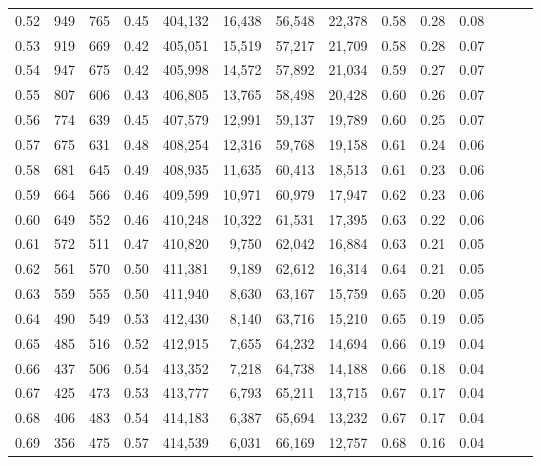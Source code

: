 \begin{tabular}{rrrrrrrrrrrrrr}
0.52 &     949 &    765 &  0.45 &  404,132 &   16,438 &  56,548 &  22,378 &  0.58 &  0.28 &      0.08 \\
0.53 &     919 &    669 &  0.42 &  405,051 &   15,519 &  57,217 &  21,709 &  0.58 &  0.28 &      0.07 \\
0.54 &     947 &    675 &  0.42 &  405,998 &   14,572 &  57,892 &  21,034 &  0.59 &  0.27 &      0.07 \\
0.55 &     807 &    606 &  0.43 &  406,805 &   13,765 &  58,498 &  20,428 &  0.60 &  0.26 &      0.07 \\
0.56 &     774 &    639 &  0.45 &  407,579 &   12,991 &  59,137 &  19,789 &  0.60 &  0.25 &      0.07 \\
0.57 &     675 &    631 &  0.48 &  408,254 &   12,316 &  59,768 &  19,158 &  0.61 &  0.24 &      0.06 \\
0.58 &     681 &    645 &  0.49 &  408,935 &   11,635 &  60,413 &  18,513 &  0.61 &  0.23 &      0.06 \\
0.59 &     664 &    566 &  0.46 &  409,599 &   10,971 &  60,979 &  17,947 &  0.62 &  0.23 &      0.06 \\
0.60 &     649 &    552 &  0.46 &  410,248 &   10,322 &  61,531 &  17,395 &  0.63 &  0.22 &      0.06 \\
0.61 &     572 &    511 &  0.47 &  410,820 &    9,750 &  62,042 &  16,884 &  0.63 &  0.21 &      0.05 \\
0.62 &     561 &    570 &  0.50 &  411,381 &    9,189 &  62,612 &  16,314 &  0.64 &  0.21 &      0.05 \\
0.63 &     559 &    555 &  0.50 &  411,940 &    8,630 &  63,167 &  15,759 &  0.65 &  0.20 &      0.05 \\
0.64 &     490 &    549 &  0.53 &  412,430 &    8,140 &  63,716 &  15,210 &  0.65 &  0.19 &      0.05 \\
0.65 &     485 &    516 &  0.52 &  412,915 &    7,655 &  64,232 &  14,694 &  0.66 &  0.19 &      0.04 \\
0.66 &     437 &    506 &  0.54 &  413,352 &    7,218 &  64,738 &  14,188 &  0.66 &  0.18 &      0.04 \\
0.67 &     425 &    473 &  0.53 &  413,777 &    6,793 &  65,211 &  13,715 &  0.67 &  0.17 &      0.04 \\
0.68 &     406 &    483 &  0.54 &  414,183 &    6,387 &  65,694 &  13,232 &  0.67 &  0.17 &      0.04 \\
0.69 &     356 &    475 &  0.57 &  414,539 &    6,031 &  66,169 &  12,757 &  0.68 &  0.16 &      0.04 \\

\end{tabular}
